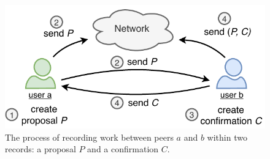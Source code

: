 

\begin{figure}[t]
	\centering
	\includegraphics[width=.75\linewidth]{trustchain/assets/interaction}
	\caption{The process of recording work between peers $ a $ and $ b $ within two records: a proposal $ P $ and a confirmation $ C $.}
	\label{fig:interaction}
\end{figure}

